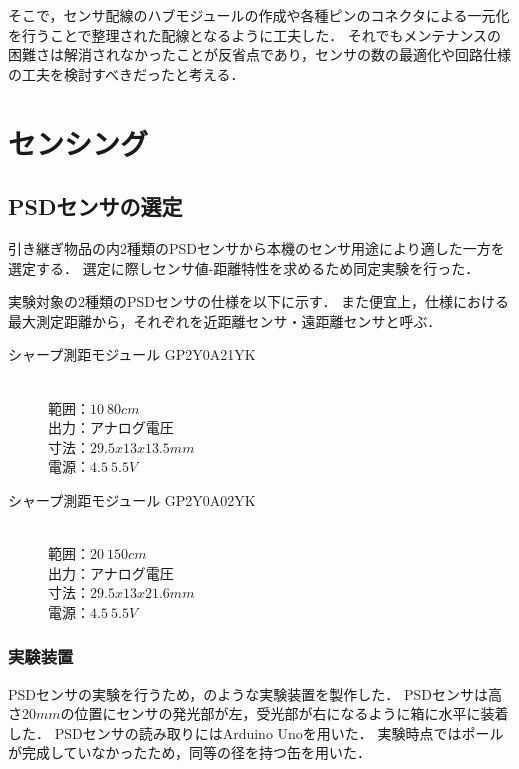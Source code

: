 \documentclass[11pt,a4]{jsarticle}
\begin{document}
    そこで，センサ配線のハブモジュールの作成や各種ピンのコネクタによる一元化を行うことで整理された配線となるように工夫した．
    それでもメンテナンスの困難さは解消されなかったことが反省点であり，センサの数の最適化や回路仕様の工夫を検討すべきだったと考える．

\section{センシング}  %

  \subsection{PSDセンサの選定}  %
    引き継ぎ物品の内2種類のPSDセンサから本機のセンサ用途により適した一方を選定する．
    選定に際しセンサ値-距離特性を求めるため同定実験を行った．

    実験対象の2種類のPSDセンサの仕様を以下に示す．
    また便宜上，仕様における最大測定距離から，それぞれを近距離センサ・遠距離センサと呼ぶ．

    \begin{description}
      \item[シャープ測距モジュール GP2Y0A21YK] \mbox{} \\
        範囲：$10~80\unit{cm}$ \\
        出力：アナログ電圧 \\
        寸法：$29.5x13x13.5\unit{mm}$ \\
        電源：$4.5~5.5\unit{V}$
    \end{description}

    \begin{description}
      \item[シャープ測距モジュール GP2Y0A02YK] \mbox{} \\
        範囲：$20~150\unit{cm}$ \\
        出力：アナログ電圧 \\
        寸法：$29.5x13x21.6\unit{mm}$ \\
        電源：$4.5~5.5\unit{V}$
    \end{description}

    \subsubsection{実験装置}
      PSDセンサの実験を行うため，のような実験装置を製作した．
      PSDセンサは高さ$20\unit{mm}$の位置にセンサの発光部が左，受光部が右になるように箱に水平に装着した．
      PSDセンサの読み取りにはArduino Unoを用いた．
      実験時点ではポールが完成していなかったため，同等の径を持つ缶を用いた．
\end{document}
